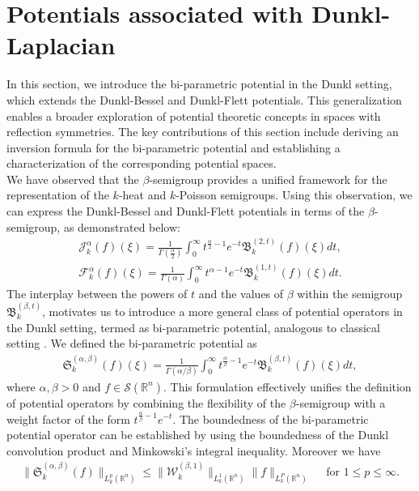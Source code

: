 \documentclass[11pt,a4paper,reqno]{amsproc}
\theoremstyle{definition}
\theoremstyle{remark}
\numberwithin{equation}{section}
\begin{document}
\section{Potentials associated with Dunkl-Laplacian } \label{S:4}
In this section, we introduce the bi-parametric potential in the Dunkl setting, which extends the Dunkl-Bessel and 
Dunkl-Flett potentials. This generalization enables a broader exploration of potential theoretic concepts in spaces with reflection symmetries. The key contributions of this section include deriving an inversion formula for the bi-parametric potential and establishing a characterization of the corresponding potential spaces.\\
We have observed that the $\beta$-semigroup provides a unified framework for the representation of the $k$-heat and $k$-Poisson semigroups. Using this observation, we can express the Dunkl-Bessel and Dunkl-Flett potentials in terms of the $\beta$-semigroup, as demonstrated below:
\begin{align*}
    \mathcal{J}_k^\alpha(f)(\xi) = \frac{1}{\Gamma(\frac{\alpha}{2})}\int_0^\infty t^{\frac{\alpha}{2}-1}e^{-t}\mathfrak{B}_k^{(2,t)}(f)(\xi)dt,\\
    \mathcal{F}_k^\alpha (f)(\xi) = \frac{1}{\Gamma(\alpha)}\int_0^\infty t^{{\alpha}-1}e^{-t}\mathfrak{B}_k^{(1,t)}(f)(\xi)dt.
\end{align*}
The interplay between the powers of $t$ and the values of $\beta$ within the semigroup $\mathfrak{B}_k^{(\beta,t)}$, motivates us to introduce a more general class of potential operators in the Dunkl setting, termed as bi-parametric potential, analogous to classical setting \cite{Aliev}. We defined the bi-parametric potential as
\begin{align} \label{bi-potential}
\mathfrak{S}_k^{(\alpha, \beta)} (f)(\xi) = \frac{1}{\Gamma(\alpha/\beta)} \int_0^\infty t^{\frac{\alpha}{\beta}-1}e^{-t} \mathfrak{B}_k^{(\beta,t)}(f)(\xi)dt,
\end{align} where $\alpha, \beta >0$ and $f\in \mathcal{S}(\mathbb{R}^n)$. This formulation effectively unifies the definition of potential operators by combining the flexibility of the $\beta$-semigroup with a weight factor of the form $t^{\frac{\alpha}{\beta}-1}e^{-t}$. The boundedness of the bi-parametric potential operator can be established by using the boundedness of the Dunkl convolution product and Minkowski's integral inequality. Moreover we have 
\begin{align*} 
    \|\mathfrak{S}_k^{(\alpha, \beta)} (f)\|_{L_k^p(\mathbb{R}^n)} \leq \| \mathcal{W}_k^{(\beta,1)}\|_{L_k^1(\mathbb{R}^n)}\|f\|_{L_k^P(\mathbb{R}^n)}\quad \text{  for $1\leq p \leq \infty$.}
\end{align*}
\end{document}
